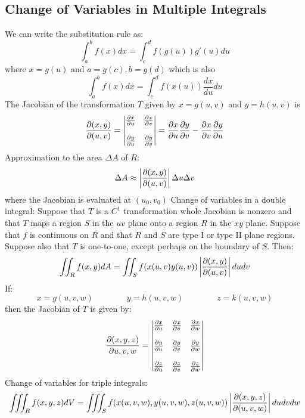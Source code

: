 \documentclass{article}
\begin{document}
    \subsection{Change of Variables in Multiple Integrals}
    \begin{outline}
        \1 We can write the substitution rule as: \[\int_a^bf(x)dx=\int_c^df(g(u))g'(u)du\] where \(x=g(u)\) and \(a=g(c),b=g(d)\) which is also \[\int_a^bf(x)dx=\int_c^df(x(u))\dfrac{dx}{du}du\]
        \1 The Jacobian of the transformation $T$ given by \(x=g(u,v)\) and \(y=h(u,v)\) is \[\pdv{(x,y)}{(u,v)}=\begin{vmatrix}
            \pdv{x}{u} & \pdv{x}{v} \\\\ \pdv{y}{u} & \pdv{y}{v}
        \end{vmatrix} = \pdv{x}{u}\pdv{y}{v}-\pdv{x}{v}\pdv{y}{u}\]
        \1 Approximation to the area \(\Delta A\) of $R$: \[\Delta A\approx\left|\pdv{(x,y)}{(u,v)}\right|\Delta u\Delta v\] where the Jacobian is evaluated at \((u_0,v_0)\)
        \1 Change of variables in a double integral: Suppose that $T$ is a \(C^1\) transformation whole Jacobian is nonzero and that $T$ maps a region $S$ in the \(uv\) plane onto a region $R$ in the \(xy\) plane. Suppose that $f$ is continuous on $R$ and that $R$ and $S$ are type I or type II plane regions. Suppose also that $T$ is one-to-one, except perhaps on the boundary of $S$. Then: \[\iint_Rf(x,y)dA=\iint_Sf(x(u,v)y(u,v))\left|\pdv{(x,y)}{(u,v)}\right|dudv\]
        \1 If: \[x=g(u,v,w)\qquad\qquad y=h(u,v,w)\qquad\qquad z=k(u,v,w)\] then the Jacobian of $T$ is given by: \[\pdv{(x,y,z)}{{u,v,w}}=\begin{vmatrix}
            \pdv{x}{u} & \pdv{x}{v} & \pdv{x}{w} \\\\ \pdv{y}{u} & \pdv{y}{v} & \pdv{y}{w} \\\\ \pdv{z}{u} & \pdv{z}{v} & \pdv{z}{w}
        \end{vmatrix}\]
        \1 Change of variables for triple integrals: \[\iiint_Rf(x,y,z)dV=\iiint_Sf(x(u,v,w),y(u,v,w),z(u,v,w))\left|\pdv{(x,y,z)}{(u,v,w)}\right| dudvdw\]
        
    \end{outline}
\end{document}
